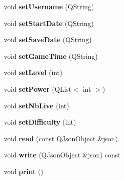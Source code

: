 \begin{DoxyCompactItemize}
\item 
\hypertarget{class_profil_a23d36025cd3b9ad9ff128021b16c2431}{}void {\bfseries set\+Username} (Q\+String)\label{class_profil_a23d36025cd3b9ad9ff128021b16c2431}

\item 
\hypertarget{class_profil_a3d6b5ead3c4e6af1aa3f4035fb3dd624}{}void {\bfseries set\+Start\+Date} (Q\+String)\label{class_profil_a3d6b5ead3c4e6af1aa3f4035fb3dd624}

\item 
\hypertarget{class_profil_a484838bb61b18b3c82fede9aaad41b35}{}void {\bfseries set\+Save\+Date} (Q\+String)\label{class_profil_a484838bb61b18b3c82fede9aaad41b35}

\item 
\hypertarget{class_profil_a2c9a526c1a26cb8b91c20a3a6df0ccc6}{}void {\bfseries set\+Game\+Time} (Q\+String)\label{class_profil_a2c9a526c1a26cb8b91c20a3a6df0ccc6}

\item 
\hypertarget{class_profil_a7edbce434f4b1c1bf1d98b704fcc650e}{}void {\bfseries set\+Level} (int)\label{class_profil_a7edbce434f4b1c1bf1d98b704fcc650e}

\item 
\hypertarget{class_profil_a1322566ebccffe1636df61c9bc74695d}{}void {\bfseries set\+Power} (Q\+List$<$ int $>$)\label{class_profil_a1322566ebccffe1636df61c9bc74695d}

\item 
\hypertarget{class_profil_ae8d5b07cd8bd4d8ad2a1e1b431056a0f}{}void {\bfseries set\+Nb\+Live} (int)\label{class_profil_ae8d5b07cd8bd4d8ad2a1e1b431056a0f}

\item 
\hypertarget{class_profil_ab4c02fb71667985e9e9ffe991ea6b824}{}void {\bfseries set\+Difficulty} (int)\label{class_profil_ab4c02fb71667985e9e9ffe991ea6b824}

\item 
\hypertarget{class_profil_ab834326ebb9864fca5aec8020d0ad6f8}{}void {\bfseries read} (const Q\+Json\+Object \&json)\label{class_profil_ab834326ebb9864fca5aec8020d0ad6f8}

\item 
\hypertarget{class_profil_a0c07c8aaf3e8b1fee2aeb5ee226f4206}{}void {\bfseries write} (Q\+Json\+Object \&json) const \label{class_profil_a0c07c8aaf3e8b1fee2aeb5ee226f4206}

\item 
\hypertarget{class_profil_a6c2dd8fc5f5604ce12959982309eed42}{}void {\bfseries print} ()\label{class_profil_a6c2dd8fc5f5604ce12959982309eed42}

\end{DoxyCompactItemize}
